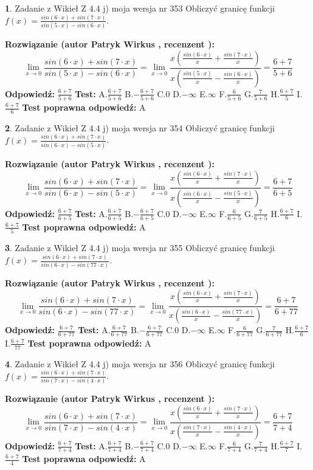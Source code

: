 \documentclass[12pt, a4paper]{article}
\theoremstyle{definition} %
\newtheorem{zad}{}
\newcommand{\zadStart}[1]{\begin{zad}#1\newline}
\newcommand{\zadStop}{\end{zad}}
\newcommand{\rozwStart}[2]{\noindent \textbf{Rozwiązanie (autor #1 , recenzent #2): }\newline}
\newcommand{\rozwStop}{\newline}
\newcommand{\odpStart}{\noindent \textbf{Odpowiedź:}\newline}
\newcommand{\odpStop}{\newline}
\newcommand{\testStart}{\noindent \textbf{Test:}\newline}
\newcommand{\testStop}{\newline}
\newcommand{\kluczStart}{\noindent \textbf{Test poprawna odpowiedź:}\newline}
\newcommand{\kluczStop}{\newline}
\begin{document}
\zadStart{Zadanie z Wikieł Z 4.4 j) moja wersja nr 353}
Obliczyć granicę funkcji $f(x)=\frac{sin(6\cdot x) +sin(7\cdot x)}{sin(5\cdot x) -sin(6\cdot x)}$.
\zadStop
\rozwStart{Patryk Wirkus}{}
$$\lim\limits_{x\to 0}\frac{sin(6\cdot x) +sin(7\cdot x)}{sin(5\cdot x) -sin(6\cdot x)}=\lim\limits_{x\to 0}\frac{x(\frac{sin(6\cdot x)}{x}+\frac{sin(7\cdot x)}{x})}{x(\frac{sin(5\cdot x)}{x}-\frac{sin(6\cdot x)}{x})}=\frac{6+7}{5+6}$$
\rozwStop
\odpStart
$\frac{6+7}{5+6}$
\odpStop
\testStart
A.$\frac{6+7}{5+6}$
B.$-\frac{6+7}{5+6}$
C.$0$
D.$-\infty$
E.$\infty$
F.$\frac{6}{5+6}$
G.$\frac{7}{5+6}$
H.$\frac{6+7}{5}$
I.$\frac{6+7}{6}$
\testStop
\kluczStart
A
\kluczStop



\zadStart{Zadanie z Wikieł Z 4.4 j) moja wersja nr 354}
Obliczyć granicę funkcji $f(x)=\frac{sin(6\cdot x) +sin(7\cdot x)}{sin(6\cdot x) -sin(5\cdot x)}$.
\zadStop
\rozwStart{Patryk Wirkus}{}
$$\lim\limits_{x\to 0}\frac{sin(6\cdot x) +sin(7\cdot x)}{sin(6\cdot x) -sin(5\cdot x)}=\lim\limits_{x\to 0}\frac{x(\frac{sin(6\cdot x)}{x}+\frac{sin(7\cdot x)}{x})}{x(\frac{sin(6\cdot x)}{x}-\frac{sin(5\cdot x)}{x})}=\frac{6+7}{6+5}$$
\rozwStop
\odpStart
$\frac{6+7}{6+5}$
\odpStop
\testStart
A.$\frac{6+7}{6+5}$
B.$-\frac{6+7}{6+5}$
C.$0$
D.$-\infty$
E.$\infty$
F.$\frac{6}{6+5}$
G.$\frac{7}{6+5}$
H.$\frac{6+7}{6}$
I.$\frac{6+7}{5}$
\testStop
\kluczStart
A
\kluczStop



\zadStart{Zadanie z Wikieł Z 4.4 j) moja wersja nr 355}
Obliczyć granicę funkcji $f(x)=\frac{sin(6\cdot x) +sin(7\cdot x)}{sin(6\cdot x) -sin(77\cdot x)}$.
\zadStop
\rozwStart{Patryk Wirkus}{}
$$\lim\limits_{x\to 0}\frac{sin(6\cdot x) +sin(7\cdot x)}{sin(6\cdot x) -sin(77\cdot x)}=\lim\limits_{x\to 0}\frac{x(\frac{sin(6\cdot x)}{x}+\frac{sin(7\cdot x)}{x})}{x(\frac{sin(6\cdot x)}{x}-\frac{sin(77\cdot x)}{x})}=\frac{6+7}{6+77}$$
\rozwStop
\odpStart
$\frac{6+7}{6+77}$
\odpStop
\testStart
A.$\frac{6+7}{6+77}$
B.$-\frac{6+7}{6+77}$
C.$0$
D.$-\infty$
E.$\infty$
F.$\frac{6}{6+77}$
G.$\frac{7}{6+77}$
H.$\frac{6+7}{6}$
I.$\frac{6+7}{77}$
\testStop
\kluczStart
A
\kluczStop



\zadStart{Zadanie z Wikieł Z 4.4 j) moja wersja nr 356}
Obliczyć granicę funkcji $f(x)=\frac{sin(6\cdot x) +sin(7\cdot x)}{sin(7\cdot x) -sin(4\cdot x)}$.
\zadStop
\rozwStart{Patryk Wirkus}{}
$$\lim\limits_{x\to 0}\frac{sin(6\cdot x) +sin(7\cdot x)}{sin(7\cdot x) -sin(4\cdot x)}=\lim\limits_{x\to 0}\frac{x(\frac{sin(6\cdot x)}{x}+\frac{sin(7\cdot x)}{x})}{x(\frac{sin(7\cdot x)}{x}-\frac{sin(4\cdot x)}{x})}=\frac{6+7}{7+4}$$
\rozwStop
\odpStart
$\frac{6+7}{7+4}$
\odpStop
\testStart
A.$\frac{6+7}{7+4}$
B.$-\frac{6+7}{7+4}$
C.$0$
D.$-\infty$
E.$\infty$
F.$\frac{6}{7+4}$
G.$\frac{7}{7+4}$
H.$\frac{6+7}{7}$
I.$\frac{6+7}{4}$
\testStop
\kluczStart
A
\kluczStop
\end{document}
